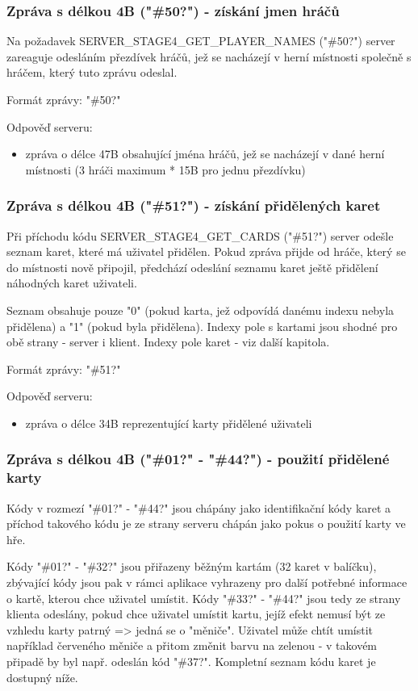 \documentclass[12pt, a4paper, pdftex, czech, titlepage]{report}
\begin{document}
\subsubsection{Zpráva s délkou 4B ("\#50?") - získání jmen hráčů}
Na požadavek SERVER\_STAGE4\_GET\_PLAYER\_NAMES ("\#50?") server
zareaguje odesláním přezdívek hráčů, jež se nacházejí v herní místnosti společně
s hráčem, který tuto zprávu odeslal.

Formát zprávy: "\#50?"

Odpověď serveru:
\begin{itemize}
\item zpráva o délce 47B obsahující jména hráčů, jež se nacházejí v dané herní místnosti (3 hráči maximum * 15B pro jednu přezdívku)
\end{itemize}

\subsubsection{Zpráva s délkou 4B ("\#51?") - získání přidělených karet}
Při příchodu kódu SERVER\_STAGE4\_GET\_CARDS ("\#51?") server
odešle seznam karet, které má uživatel přidělen. Pokud zpráva přijde od hráče,
který se do místnosti nově připojil, předchází odeslání seznamu karet ještě přidělení náhodných karet uživateli.

Seznam obsahuje pouze "0" (pokud karta, jež odpovídá danému indexu nebyla přidělena) a "1" (pokud byla přidělena). Indexy pole s kartami jsou shodné pro obě strany - server i klient. Indexy pole karet - viz další kapitola.

Formát zprávy: "\#51?"

Odpověď serveru:
\begin{itemize}
\item zpráva o délce 34B reprezentující karty přidělené uživateli
\end{itemize}

\subsubsection{Zpráva s délkou 4B ("\#01?" - "\#44?") - použití přidělené karty}
Kódy v rozmezí "\#01?" - "\#44?" jsou chápány jako identifikační kódy karet a příchod takového
kódu je ze strany serveru chápán jako pokus o použití karty ve hře.

Kódy "\#01?" - "\#32?" jsou přiřazeny běžným kartám (32 karet v balíčku), zbývající kódy
jsou pak v rámci aplikace vyhrazeny pro další potřebné informace o kartě, kterou chce
uživatel umístit. Kódy "\#33?" - "\#44?" jsou tedy ze strany klienta odeslány, pokud
chce uživatel umístit kartu, jejíž efekt nemusí být ze vzhledu karty patrný => jedná se o "měniče".
Uživatel může chtít umístit například červeného měniče a přitom změnit barvu
na zelenou - v takovém připadě by byl např. odeslán kód "\#37?". Kompletní
seznam kódu karet je dostupný níže.
\end{document}
